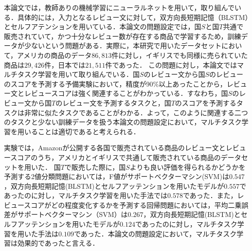 \documentclass[dvipdfmx,twocolumn,10.5pt]{jsarticle}
\begin{document}
本論文では，教師ありの機械学習にニューラルネットを用いて，取り組んでいる．具体的には，入力となるレビュー文に対して，双方向長短期記憶（BLSTM）とセルフアテンションを用いている．本論文の問題設定では，国$S$と国$T$共通で販売されていて，かつ十分なレビュー数が存在する商品で学習するため，訓練データが少ないという問題がある．実際に，本研究で用いたデータセットにおいて，アメリカの商品のデータ$86,813$件に対し，イギリスでも同様に売られていた商品は$29,426$件，日本では$21,511$件であった．
この問題に対し，本論文ではマルチタスク学習を用いて取り組んでいる．国$S$のレビュー文から国$S$のレビューのスコアを予測する予備実験において，精度が90\%以上あったことから，レビュー文とレビュースコアは強く関連することがわかっている．すなわち，国$S$のレビュー文から国$T$のレビュー文を予測するタスクと，国$T$のスコアを予測するタスクは非常に似たタスクであることがわかる．よって，このように関連する二つのタスクと少ない訓練データを扱う本論文の問題設定において，マルチタスク学習を用いることは適切であると考えられる．

実験では，Amazonが公開する各国で販売されている商品のレビュー文とレビュースコアのうち，アメリカとイギリスで共通して販売されている商品のデータセットを用いた．
国$T$で販売した際に，国$S$よりも良い評価を得られるかどうかを予測する2値分類問題においては，F値がサポートベクターマシン(SVM)は$0.547$，双方向長短期記憶(BLSTM)とセルフアッテンションを用いたモデルが$0.557$であったのに対し，マルチタスク学習を用いた手法では$0.578$であった．また，レビュースコアがどの程度変化するかを予測する回帰問題においては，平均二乗誤差がサポートベクターマシン（SVM）は$0.267$，双方向長短期記憶(BLSTM)とセルフアッテンションを用いたモデルが$0.124$であったのに対し，マルチタスク学習を用いた手法は$0.109$であった．本論文の問題設定において，マルチタスク学習は効果的であったと言える．
\end{document}
